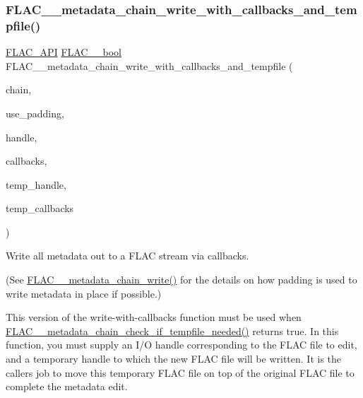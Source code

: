 \subsubsection{\texorpdfstring{FLAC\_\_metadata\_chain\_write\_with\_callbacks\_and\_tempfile()}{FLAC\_\_metadata\_chain\_write\_with\_callbacks\_and\_tempfile()}}
{\footnotesize\ttfamily \mbox{\hyperlink{group__flac__export_ga56ca07df8a23310707732b1c0007d6f5}{F\+L\+A\+C\+\_\+\+A\+PI}} \mbox{\hyperlink{ordinals_8h_a95103469f1cbd78b8cf250194985b34e}{F\+L\+A\+C\+\_\+\+\_\+bool}} F\+L\+A\+C\+\_\+\+\_\+metadata\+\_\+chain\+\_\+write\+\_\+with\+\_\+callbacks\+\_\+and\+\_\+tempfile (\begin{DoxyParamCaption}\item[{\mbox{\hyperlink{group__flac__metadata__level2_gaec6993c60b88f222a52af86f8f47bfdf}{F\+L\+A\+C\+\_\+\+\_\+\+Metadata\+\_\+\+Chain}} $\ast$}]{chain,  }\item[{\mbox{\hyperlink{ordinals_8h_a95103469f1cbd78b8cf250194985b34e}{F\+L\+A\+C\+\_\+\+\_\+bool}}}]{use\+\_\+padding,  }\item[{\mbox{\hyperlink{group__flac__callbacks_ga4c329c3168dee6e352384c5e9306260d}{F\+L\+A\+C\+\_\+\+\_\+\+I\+O\+Handle}}}]{handle,  }\item[{\mbox{\hyperlink{struct_f_l_a_c_____i_o_callbacks}{F\+L\+A\+C\+\_\+\+\_\+\+I\+O\+Callbacks}}}]{callbacks,  }\item[{\mbox{\hyperlink{group__flac__callbacks_ga4c329c3168dee6e352384c5e9306260d}{F\+L\+A\+C\+\_\+\+\_\+\+I\+O\+Handle}}}]{temp\+\_\+handle,  }\item[{\mbox{\hyperlink{struct_f_l_a_c_____i_o_callbacks}{F\+L\+A\+C\+\_\+\+\_\+\+I\+O\+Callbacks}}}]{temp\+\_\+callbacks }\end{DoxyParamCaption})}

Write all metadata out to a F\+L\+AC stream via callbacks.

(See \mbox{\hyperlink{group__flac__metadata__level2_gaa15ead7230217de8e79f4af822cda490}{F\+L\+A\+C\+\_\+\+\_\+metadata\+\_\+chain\+\_\+write()}} for the details on how padding is used to write metadata in place if possible.)

This version of the write-\/with-\/callbacks function must be used when \mbox{\hyperlink{group__flac__metadata__level2_ga29a124cceaffce5376d073a032bd1c52}{F\+L\+A\+C\+\_\+\+\_\+metadata\+\_\+chain\+\_\+check\+\_\+if\+\_\+tempfile\+\_\+needed()}} returns true. In this function, you must supply an I/O handle corresponding to the F\+L\+AC file to edit, and a temporary handle to which the new F\+L\+AC file will be written. It is the caller\textquotesingle{}s job to move this temporary F\+L\+AC file on top of the original F\+L\+AC file to complete the metadata edit.

